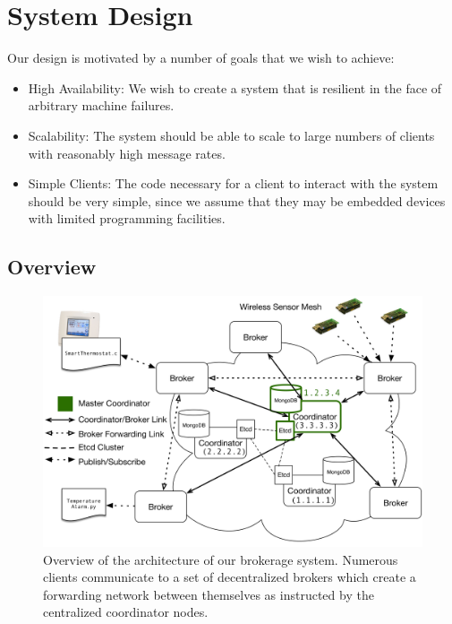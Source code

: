 \section{System Design} \label{section:coordinator}


Our design is motivated by a number of goals that we wish to achieve:
\begin{itemize}
\item High Availability: We wish to create a system that is resilient in the face of arbitrary machine failures.
\item Scalability: The system should be able to scale to large numbers of clients with reasonably high message rates.
\item Simple Clients: The code necessary for a client to interact with the system should be very simple, since we assume that they may be embedded devices with limited programming facilities.
\end{itemize}

\subsection{Overview}

\begin{figure}[t]
\centering
\includegraphics[width=6.5in]{figs/full_architecture.pdf}
\caption{Overview of the architecture of our brokerage system.
Numerous clients communicate to a set of decentralized brokers which create a forwarding network between themselves as instructed by the centralized coordinator nodes.}
\label{fig:architecture}
\end{figure}


